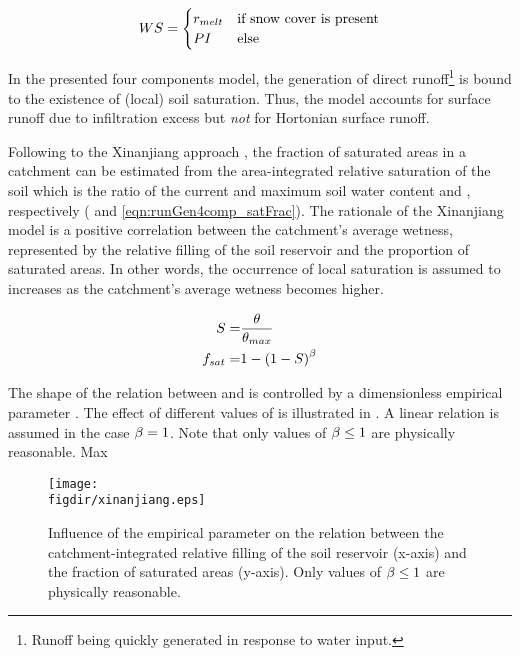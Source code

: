 \begin{align} \label{eqn:runGen4comp_waterSupply}
  WS =
  \begin{cases}
    r_{melt} & \text{if snow cover is present} \\
    PI & \text{else} \\
  \end{cases}
\end{align}

In the presented four components model, the generation of direct runoff\footnote{Runoff being quickly generated in response to water input.} is bound to the existence of (local) soil saturation. Thus, the model accounts for surface runoff due to infiltration excess but \emph{not} for Hortonian surface runoff.

Following to the Xinanjiang approach \citep{Zhao1980}, the fraction of saturated areas \satFrac{} in a catchment can be estimated from the area-integrated relative saturation of the soil \relSat{} which is the ratio of the current and maximum soil water content \soilWaterContent{} and \soilWaterContentMax{}, respectively ( and \ref{eqn:runGen4comp_satFrac}). The rationale of the Xinanjiang model is a positive correlation between the catchment's average wetness, represented by the relative filling of the soil reservoir and the proportion of saturated areas. In other words, the occurrence of local saturation is assumed to increases as the catchment's average wetness becomes higher.

\begin{align}
  S =& \frac{\theta}{\theta_{max}} \label{eqn:runGen4comp_relativeSaturation} \\
  f_{sat}=& 1 - \left( 1 - S \right) ^ {{\beta}} \label{eqn:runGen4comp_satFrac}
\end{align}

The shape of the relation between \relSat{} and \satFrac{} is controlled by a dimensionless empirical parameter \expSatFrac{}. The effect of different values of \expSatFrac{} is illustrated in . A linear relation is assumed in the case ${\beta}{}=1$. Note that only values of ${\beta}{} \le 1$ are physically reasonable.
Max
\begin{figure}
  \texttt{[image: \\figdir/xinanjiang.eps]}
  \caption[Influence of the empirical parameter \expSatFrac{}.]{Influence of the empirical parameter \expSatFrac{} on the relation between the catchment-integrated relative filling of the soil reservoir (x-axis) and the fraction of saturated areas \satFrac{} (y-axis). Only values of ${\beta}{} \le 1$ are physically reasonable. \label{fig:runGen4comp_expSatFrac}}
\end{figure}

